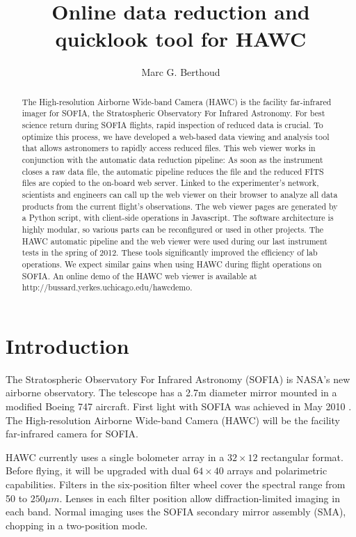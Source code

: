 \documentclass[11pt,twoside]{article}
\begin{document}
\title{Online data reduction and quicklook tool for HAWC}
\author{Marc G. Berthoud
}

\begin{abstract}
The High-resolution Airborne Wide-band Camera (HAWC) is the facility
far-infrared imager for SOFIA, the Stratospheric Observatory For
Infrared Astronomy.  For best science return during SOFIA flights,
rapid inspection of reduced data is crucial. To optimize this process,
we have developed a web-based data viewing and analysis tool that
allows astronomers to rapidly access reduced files.  This web viewer
works in conjunction with the automatic data reduction pipeline: As
soon as the instrument closes a raw data file, the automatic pipeline
reduces the file and the reduced FITS files are copied to the on-board
web server. Linked to the experimenter's network, scientists and
engineers can call up the web viewer on their browser to analyze all
data products from the current flight's observations.  The web viewer
pages are generated by a Python script, with client-side operations in
Javascript. The software architecture is highly modular, so various
parts can be reconfigured or used in other projects.  The HAWC
automatic pipeline and the web viewer were used during our last
instrument tests in the spring of 2012. These tools significantly
improved the efficiency of lab operations. We expect similar gains
when using HAWC during flight operations on SOFIA. An online demo of
the HAWC web viewer is available at
http://bussard.yerkes.uchicago.edu/hawcdemo.\end{abstract}

\section{Introduction}

The Stratospheric Observatory For Infrared Astronomy (SOFIA) is NASA's
new airborne observatory. The telescope has a 2.7m diameter mirror
mounted in a modified Boeing 747 aircraft. First light with SOFIA was
achieved in May 2010 \citep{herter12}. The High-resolution Airborne
Wide-band Camera (HAWC) will be the facility far-infrared camera for
SOFIA.

HAWC currently uses a single bolometer array in a $32\times12$
rectangular format. Before flying, it will be upgraded with dual
$64\times40$ arrays and polarimetric capabilities. Filters in the
six-position filter wheel cover the spectral range from 50 to $250\mu
m$. Lenses in each filter position allow diffraction-limited imaging in
each band. Normal imaging uses the SOFIA secondary mirror assembly
(SMA), chopping in a two-position mode.
\end{document}
